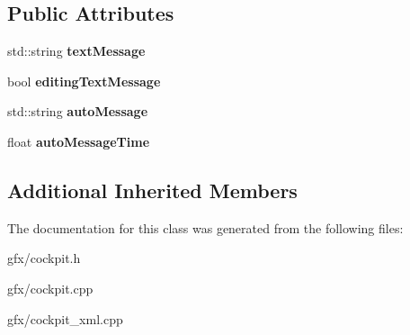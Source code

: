 \subsection*{Public Attributes}
\begin{DoxyCompactItemize}
\item 
std\+::string {\bfseries text\+Message}\hypertarget{classGameCockpit_aef8822d33319732962a6e4179c835dd6}{}\label{classGameCockpit_aef8822d33319732962a6e4179c835dd6}

\item 
bool {\bfseries editing\+Text\+Message}\hypertarget{classGameCockpit_a285c1233784801e1975ae8a3af23fa01}{}\label{classGameCockpit_a285c1233784801e1975ae8a3af23fa01}

\item 
std\+::string {\bfseries auto\+Message}\hypertarget{classGameCockpit_aa9baf9b4a4cb9506615710985ff6f37d}{}\label{classGameCockpit_aa9baf9b4a4cb9506615710985ff6f37d}

\item 
float {\bfseries auto\+Message\+Time}\hypertarget{classGameCockpit_a1869ca9acd1fe36d5049f8dbd770d551}{}\label{classGameCockpit_a1869ca9acd1fe36d5049f8dbd770d551}

\end{DoxyCompactItemize}
\subsection*{Additional Inherited Members}


The documentation for this class was generated from the following files\+:\begin{DoxyCompactItemize}
\item 
gfx/cockpit.\+h\item 
gfx/cockpit.\+cpp\item 
gfx/cockpit\+\_\+xml.\+cpp\end{DoxyCompactItemize}
